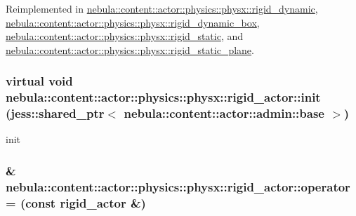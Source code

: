 Reimplemented in \hyperlink{classnebula_1_1content_1_1actor_1_1physics_1_1physx_1_1rigid__dynamic_a0c7836a5a0fb5a6e1bdb50ec4e250d27}{nebula::content::actor::physics::physx::rigid\_\-dynamic}, \hyperlink{classnebula_1_1content_1_1actor_1_1physics_1_1physx_1_1rigid__dynamic__box_a2f7f5578f4651247e1440338b372438b}{nebula::content::actor::physics::physx::rigid\_\-dynamic\_\-box}, \hyperlink{classnebula_1_1content_1_1actor_1_1physics_1_1physx_1_1rigid__static_aa98f8ef1b2ba6b59b36e4e6506aee2d9}{nebula::content::actor::physics::physx::rigid\_\-static}, and \hyperlink{classnebula_1_1content_1_1actor_1_1physics_1_1physx_1_1rigid__static__plane_a20338f07330b2d7565d0b75732e68d09}{nebula::content::actor::physics::physx::rigid\_\-static\_\-plane}.\hypertarget{classnebula_1_1content_1_1actor_1_1physics_1_1physx_1_1rigid__actor_aa97998670aef04432902309cf30a6d5e}{
\subsubsection[{init}]{\setlength{\rightskip}{0pt plus 5cm}virtual void nebula::content::actor::physics::physx::rigid\_\-actor::init (jess::shared\_\-ptr$<$ {\bf nebula::content::actor::admin::base} $>$)}}
\label{classnebula_1_1content_1_1actor_1_1physics_1_1physx_1_1rigid__actor_aa97998670aef04432902309cf30a6d5e}


init \hypertarget{classnebula_1_1content_1_1actor_1_1physics_1_1physx_1_1rigid__actor_a154a4725bb0aeaace59931e56be6258a}{
\subsubsection[{operator=}]{\& nebula::content::actor::physics::physx::rigid\_\-actor::operator= (const {\bf rigid\_\-actor} \&)}}
\label{classnebula_1_1content_1_1actor_1_1physics_1_1physx_1_1rigid__actor_a154a4725bb0aeaace59931e56be6258a}


